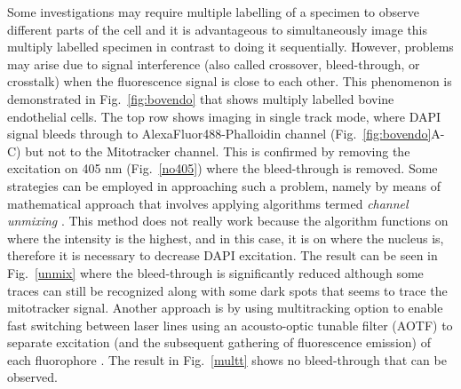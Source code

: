 Some investigations may require multiple labelling of a specimen to observe different parts of the cell and it is advantageous to simultaneously image this multiply labelled specimen in contrast to doing it sequentially. 
However, problems may arise due to signal interference (also called crossover, bleed-through, or crosstalk) when the fluorescence signal is close to each other. 
This phenomenon is demonstrated in Fig.~\ref{fig:bovendo} that shows multiply labelled bovine endothelial cells. 
The top row shows imaging in single track mode, where DAPI signal bleeds through to AlexaFluor488-Phalloidin channel (Fig.~\ref{fig:bovendo}A-C) but not to the Mitotracker channel. 
This is confirmed by removing the excitation on 405 nm (Fig.~\ref{no405}) where the bleed-through is removed. 
Some strategies can be employed in approaching such a problem, namely by means of mathematical approach that involves applying algorithms termed \textit{channel unmixing} \cite{NikonMicro}\cite{Lect11}. 
This method does not really work because the algorithm functions on where the intensity is the highest, and in this case, it is on where the nucleus is, therefore it is necessary to decrease DAPI excitation. 
The result can be seen in Fig.~\ref{unmix} where the bleed-through is significantly reduced although some traces can still be recognized along with some dark spots that seems to trace the mitotracker signal. 
Another approach is by using multitracking option to enable fast switching between laser lines using an acousto-optic tunable filter (AOTF) to separate excitation (and the subsequent gathering of fluorescence emission) of each fluorophore \cite{ZeissCamp2}. 
The result in Fig.~\ref{multt} shows no bleed-through that can be observed.

